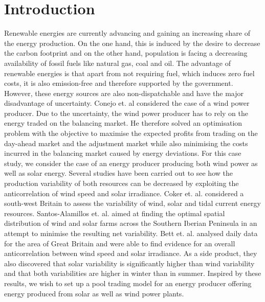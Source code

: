 \section{Introduction}

Renewable energies are currently advancing and gaining an increasing share of the energy production. On the one hand, this is induced by the desire to decrease the carbon footprint and on the other hand, population is facing a decreasing availability of fossil fuels like natural gas, coal and oil. The advantage of renewable energies is that apart from not requiring fuel, which induces zero fuel costs, it is also emission-free and therefore supported by the government. However, these energy sources are also non-dispatchable and have the major disadvantage of uncertainty. Conejo et. al considered the case of a wind power producer. Due to the uncertainty, the wind power producer has to rely on the energy traded on the balancing market. He therefore solved an optimisation problem with the objective to maximise the expected profits from trading on the day-ahead market and the adjustment market while also minimising the costs incurred in the balancing market caused by energy deviations. 
For this case study, we consider the case of an energy producer producing both wind power as well as solar energy. Several studies have been carried out to see how the production variability of both resources can be decreased by exploiting the anticorrelation of wind speed and solar irradiance. Coker et. al. considered a south-west Britain to assess the variability of wind, solar and tidal current energy resources. Santos-Alamillos et. al. aimed at finding the optimal spatial distribution of wind and solar farms across the Southern Iberian Peninsula in an attempt to minimise the resulting net variability. Bett et. al. analysed daily data for the area of Great Britain and were able to find evidence for an overall anticorrelation between wind speed and solar irradiance. As a side product, they also discovered that solar variability is significantly higher than wind variability and that both variabilities are higher in winter than in summer. Inspired by these results, we wish to set up a pool trading model for an energy producer offering energy produced from solar as well as wind power plants.  
